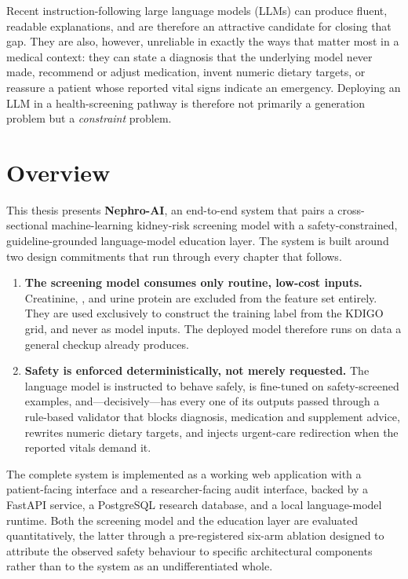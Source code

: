Recent instruction-following large language models (LLMs) can produce fluent,
readable explanations, and are therefore an attractive candidate for closing
that gap. They are also, however, unreliable in exactly the ways that matter
most in a medical context: they can state a diagnosis that the underlying model
never made, recommend or adjust medication, invent numeric dietary targets, or
reassure a patient whose reported vital signs indicate an emergency. Deploying
an LLM in a health-screening pathway is therefore not primarily a generation
problem but a \emph{constraint} problem.

\section{Overview}
\label{sec:overview}

This thesis presents \textbf{Nephro-AI}, an end-to-end system that pairs a
cross-sectional machine-learning kidney-risk screening model with a
safety-constrained, guideline-grounded language-model education layer. The
system is built around two design commitments that run through every chapter
that follows.

\begin{enumerate}
  \item \textbf{The screening model consumes only routine, low-cost inputs.}
        Creatinine, \eGFR, \UACR{} and urine protein are excluded from the
        feature set entirely. They are used exclusively to construct the
        training label from the KDIGO grid, and never as model inputs. The
        deployed model therefore runs on data a general checkup already
        produces.
  \item \textbf{Safety is enforced deterministically, not merely requested.}
        The language model is instructed to behave safely, is fine-tuned on
        safety-screened examples, and---decisively---has every one of its
        outputs passed through a rule-based validator that blocks diagnosis,
        medication and supplement advice, rewrites numeric dietary targets, and
        injects urgent-care redirection when the reported vitals demand it.
\end{enumerate}

The complete system is implemented as a working web application with a
patient-facing interface and a researcher-facing audit interface, backed by a
FastAPI service, a PostgreSQL research database, and a local language-model
runtime. Both the screening model and the education layer are evaluated
quantitatively, the latter through a pre-registered six-arm ablation designed
to attribute the observed safety behaviour to specific architectural
components rather than to the system as an undifferentiated whole.

